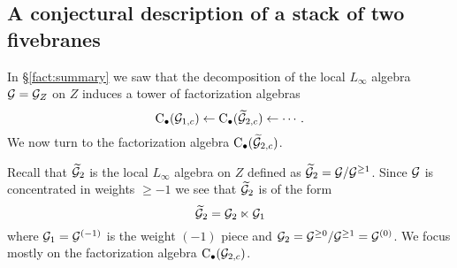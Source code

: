 %
%
%
%
%

\subsection{A conjectural description of a stack of two fivebranes}

In \S\ref{fact:summary} we saw that the decomposition of the local $L_\infty$ algebra $\mathcal G = \mathcal G_Z$ on $Z$ induces a tower of factorization algebras 
\[
{\rm C}_{\bullet}(\mathcal G_{1,c}) \leftarrow {\rm C}_{\bullet}(\widetilde {\mathcal G}_{2,c}) \leftarrow \cdots .
\]
We now turn to the factorization algebra ${\rm C}_{\bullet}(\widetilde {\mathcal G}_{2,c})$.

Recall that $\widetilde {\mathcal G}_{2}$ is the local $L_\infty$ algebra on $Z$ defined as $\widetilde {\mathcal G}_{2} = \mathcal G / \mathcal G^{\geq 1}$. 
Since $\mathcal G$ is concentrated in weights $\geq -1$ we see that $\widetilde {\mathcal G}_{2}$ is of the form
\[
\widetilde {\mathcal G}_2 = \mathcal G_2 \ltimes \mathcal G_1 
\]
where $\mathcal G_1 = \mathcal G^{(-1)}$ is the weight $(-1)$ piece and $\mathcal G_2 = \mathcal G^{\geq 0} / \mathcal G^{\geq 1} = \mathcal G^{(0)}$.  
We focus mostly on the factorization algebra ${\rm C}_\bullet(\mathcal G_{2,c})$.

